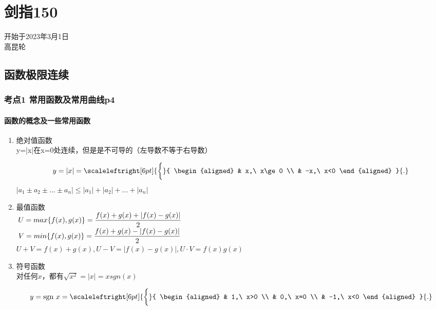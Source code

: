 \chapter{剑指150}
开始于2023年3月1日\\高昆轮
\section{函数极限连续}
\subsection{考点1 常用函数及常用曲线p4}
\subsubsection{函数的概念及一些常用函数}
\begin{enumerate}
    \item 绝对值函数\\
    y=|x|在x=0处连续，但是是不可导的（左导数不等于右导数）\par
        \begin{equation*}
        y=|x|=
        \scaleleftright[6pt]{\biggl\{}{
        \begin{aligned}
        & x,\ x\ge 0 \\
        & -x,\ x<0
        \end{aligned}
        }{.}
        \end{equation*}
    $|a_1 \pm a_2 \pm... \pm a_n|\le|a_1|+|a_2|+...+|a_n|$

    \item 最值函数\\
    $\displaystyle\hspace{.2em} U=max\{f(x),g(x)\}= \frac{f(x)+g(x)+|f(x)-g(x)|}{2}$\\
    $\displaystyle\hspace{.2em} V=min\{f(x),g(x)\}= \frac{f(x)+g(x)-|f(x)-g(x)|}{2}$\\
    $U+V=f(x)+g(x),U-V=|f(x)-g(x)|,U \cdot V=f(x)g(x)$

    \item 符号函数\\
    对任何$x$，都有$\sqrt{x^2}=|x|=xsgn(x)$\par
    \begin{equation*}
        y=\text{sgn}\ x=
        \scaleleftright[6pt]{\biggl\{}{
            \begin{aligned}
                & 1,\ x>0 \\
                & 0,\ x=0 \\
                & -1,\ x<0
            \end{aligned}
            }{.}
        \end{equation*}
    

\end{enumerate}
